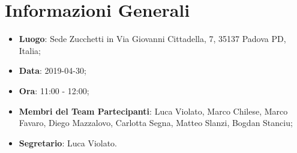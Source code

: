 \section{Informazioni Generali}
\begin{itemize}
	\item \textbf{Luogo}: Sede Zucchetti in Via Giovanni Cittadella, 7, 35137 Padova PD, Italia; 
	\item \textbf{Data}: 2019-04-30; 
	\item \textbf{Ora}: 11:00 - 12:00; 
	\item \textbf{Membri del Team Partecipanti}: Luca Violato, Marco Chilese, Marco Favaro, Diego Mazzalovo, Carlotta Segna, Matteo Slanzi, Bogdan Stanciu; 
	\item \textbf{Segretario}: Luca Violato. 
\end{itemize}